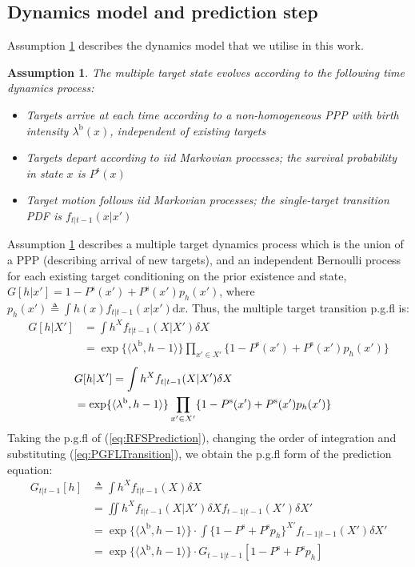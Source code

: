 \documentclass[journal,twoside]{IEEEtran}
\theoremstyle{plain}
\newtheorem{assumption}{Assumption}
\begin{document}
\subsection{Dynamics model and prediction step}
\label{ss:RFSPrediction}
%
Assumption \ref{ass:Dynamics} describes the dynamics model that we utilise in this work.
\begin{assumption}
The multiple target state evolves according to the following time dynamics process:
%
\begin{itemize}
\item Targets arrive at each time according to a non-homogeneous PPP with birth intensity $\lambda^\mathrm{b}(x)$, independent of existing targets
\item Targets depart according to iid Markovian processes; the survival probability in state $x$ is $P^{\mathrm{s}}(x)$
\item Target motion follows iid Markovian processes; the single-target transition PDF is $f_{t|t-1}(x|x')$
\end{itemize}
\label{ass:Dynamics}
\end{assumption}
Assumption \ref{ass:Dynamics} describes a multiple target dynamics process which is the union of a PPP (describing arrival of new targets), and an independent Bernoulli process for each existing target conditioning on the prior existence and state, $G[h|x'] = 1 - P^{\mathrm{s}}(x') + P^{\mathrm{s}}(x') p_h(x')$, where $p_h(x') \triangleq \int{h(x) f_{t|t-1}(x|x')\mathrm{d} x}$. Thus, the multiple target transition p.g.fl is: \cite[p474]{Mah07}
%
\ifCLASSOPTIONdraftcls
\begin{align}
G[h|X'] &= \int{h^X f_{t|t-1}(X|X') \delta X} \\
&= \exp\{\langle\lambda^\mathrm{b},h-1\rangle\} \prod_{x'\in X'}\{1 - P^{\mathrm{s}}(x') + P^{\mathrm{s}}(x') p_h(x')\} \label{eq:PGFLTransition}
\end{align}
\else
\begin{align}
\lefteqn{G[h|X'] = \int{h^X f_{t|t-1}(X|X') \delta X}} \\
&= \exp\{\langle\lambda^\mathrm{b},h-1\rangle\} \prod_{x'\in X'}\{1 - P^{\mathrm{s}}(x') + P^{\mathrm{s}}(x') p_h(x')\} \label{eq:PGFLTransition}
\end{align}
\fi
%
Taking the p.g.fl of (\ref{eq:RFSPrediction}), changing the order of integration and substituting (\ref{eq:PGFLTransition}), we obtain the p.g.fl form of the prediction equation: \cite[p529]{Mah07}
%
\ifCLASSOPTIONdraftcls
\begin{align}
G_{t|t-1}[h] &\triangleq \int{h^X f_{t|t-1}(X) \delta X} \\
&= \iint{h^X f_{t|t-1}(X|X')\delta X f_{t-1|t-1}(X') \delta X'} \\
&= \exp\{\langle\lambda^\mathrm{b},h-1\rangle\}\cdot \int{\{1-P^{\mathrm{s}} + P^{\mathrm{s}} p_h\}^{X'}f_{t-1|t-1}(X')\delta X'} \\
&= \exp\{\langle\lambda^\mathrm{b},h-1\rangle\} \cdot G_{t-1|t-1}[1-P^{\mathrm{s}} + P^{\mathrm{s}} p_h] \label{eq:PGFLPrediction}
\end{align}
\end{document}

